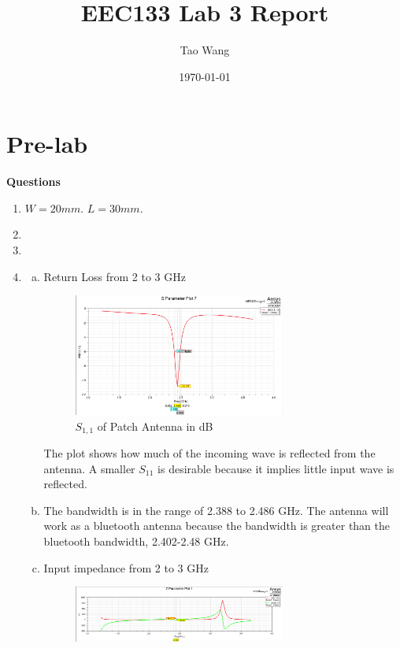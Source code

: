 \documentclass{article} %
\begin{document}
\title{EEC133 Lab 3 Report}
\author{Tao Wang}
\date{\today}

\maketitle

\section*{Pre-lab}
\textbf{Questions}
\begin{enumerate}[(1)]
    \item $W = 20 \si{mm}$. $L = 30 \si{mm}$.
    \item
    \item
    \item
          \begin{enumerate}[(a)]
              \item Return Loss from 2 to 3 GHz
                    \begin{figure}[H]
                        \centering
                        \includegraphics[width=0.7\textwidth]{./image/figure1.png}
                        \caption{$S_{1, 1}$ of Patch Antenna in dB}
                    \end{figure}
                    The plot shows how much of the incoming wave is reflected from the antenna. A smaller $S_{11}$ is desirable because it implies little input wave is reflected.
              \item The bandwidth is in the range of 2.388 to 2.486 GHz. The antenna will work as a bluetooth antenna because the bandwidth is greater than the bluetooth bandwidth, 2.402-2.48 GHz.
              \item Input impedance from 2 to 3 GHz
                    \begin{figure}[H]
                        \centering
                        \includegraphics[width=0.7\textwidth]{./image/figure2.png}

\end{figure}
\end{enumerate}
\end{enumerate}
\end{document}
